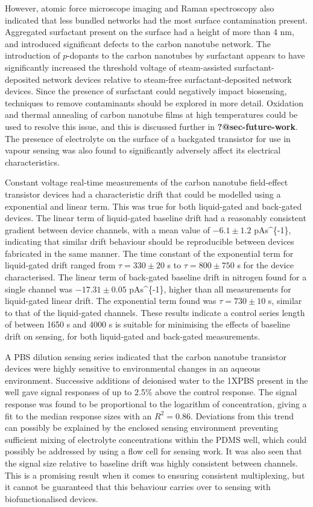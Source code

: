 \documentclass[
  a4paper,
]{scrbook}
\begin{document}
However, atomic force microscope imaging and Raman spectroscopy also
indicated that less bundled networks had the most surface contamination
present. Aggregated surfactant present on the surface had a height of
more than 4 nm, and introduced significant defects to the carbon
nanotube network. The introduction of \(p\)-dopants to the carbon
nanotubes by surfactant appears to have significantly increased the
threshold voltage of steam-assisted surfactant-deposited network devices
relative to steam-free surfactant-deposited network devices. Since the
presence of surfactant could negatively impact biosensing, techniques to
remove contaminants should be explored in more detail. Oxidation and
thermal annealing of carbon nanotube films at high temperatures could be
used to resolve this issue, and this is discussed further in
\textbf{?@sec-future-work}. The presence of electrolyte on the surface
of a backgated transistor for use in vapour sensing was also found to
significantly adversely affect its electrical characteristics.

Constant voltage real-time measurements of the carbon nanotube
field-effect transistor devices had a characteristic drift that could be
modelled using a exponential and linear term. This was true for both
liquid-gated and back-gated devices. The linear term of liquid-gated
baseline drift had a reasonably consistent gradient between device
channels, with a mean value of \(-6.1 \pm 1.2\) pAs\^{}\{-1\},
indicating that similar drift behaviour should be reproducible between
devices fabricated in the same manner. The time constant of the
exponential term for liquid-gated drift ranged from
\(\tau = 330 \pm 20\) s to \(\tau = 800 \pm 750\) s for the device
characterised. The linear term of back-gated baseline drift in nitrogen
found for a single channel was \(-17.31\pm0.05\) pAs\^{}\{-1\}, higher
than all measurements for liquid-gated linear drift. The exponential
term found was \(\tau = 730 \pm 10\) s, similar to that of the
liquid-gated channels. These results indicate a control series length of
between 1650 s and 4000 s is suitable for minimising the effects of
baseline drift on sensing, for both liquid-gated and back-gated
measurements.

A PBS dilution sensing series indicated that the carbon nanotube
transistor devices were highly sensitive to environmental changes in an
aqueous environment. Successive additions of deionised water to the
1XPBS present in the well gave signal responses of up to 2.5\% above the
control response. The signal response was found to be proportional to
the logarithm of concentration, giving a fit to the median response
sizes with an \(R^2 = 0.86\). Deviations from this trend can possibly be
explained by the enclosed sensing environment preventing sufficient
mixing of electrolyte concentrations within the PDMS well, which could
possibly be addressed by using a flow cell for sensing work. It was also
seen that the signal size relative to baseline drift was highly
consistent between channels. This is a promising result when it comes to
ensuring consistent multiplexing, but it cannot be guaranteed that this
behaviour carries over to sensing with biofunctionalised devices.
\end{document}
